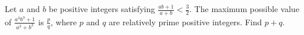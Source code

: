 Let $a$ and $b$ be positive integers satisfying $\frac{ab+1}{a+b}<\frac{3}{2}$. The maximum possible value of $\frac{a^3b^3+1}{a^3+b^3}$ is $\frac{p}{q}$,  where $p$ and $q$ are relatively prime positive integers. Find $p+q$.
